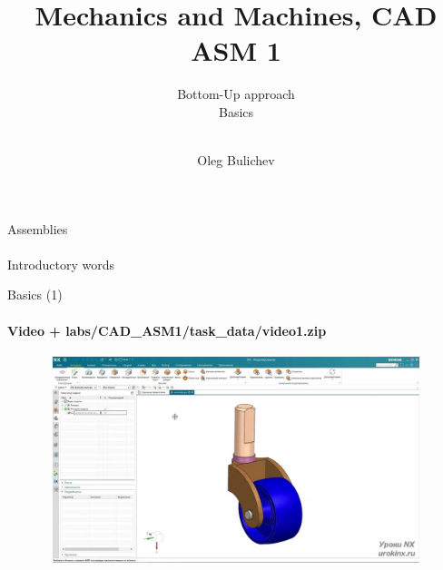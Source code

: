 \documentclass[aspectratio=169]{beamer}
\title[MaM]{Mechanics and Machines, CAD ASM 1} %
\subtitle{Bottom-Up approach
\\ Basics \\ \ 
         } %
\author{Oleg Bulichev}
\newcommand{\fbckg}[1]{\usebackgroundtemplate{\texttt{[image: \#1]}}}%
\begin{document}
\setlength{\abovedisplayskip}{0pt}
\setlength{\belowdisplayskip}{0pt}
\setlength{\abovedisplayshortskip}{0pt}
\setlength{\belowdisplayshortskip}{0pt}

\fbckg{fibeamer/figs/title_page.png}

\fbckg{fibeamer/figs/common.png}

\note{\scriptsize \begin{itemize}
        \item \
    \end{itemize}}

\note{
   \ 
}

\begin{frame}[c]{Assemblies}
\framesubtitle{}
    \centering
    \Huge
    Introductory words
\end{frame}

\begin{frame}[t]{Basics (1)}
    \framesubtitle{Video + labs/CAD\_ASM1/task\_data/video1.zip}
    \vspace{-0.6cm}
    \begin{figure}[H]
        \href{https://disk.yandex.ru/i/eTpcseXL44F6jQ}{
            \centering\includegraphics[height=6cm,width=1\textwidth,keepaspectratio]{1.png}}
        \label{fig:1}
    \end{figure}
\end{frame}
\end{document}
